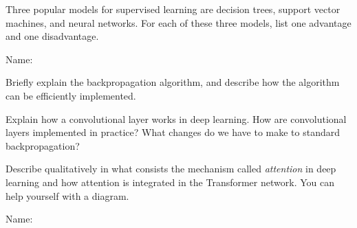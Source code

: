 \documentclass[11pt]{article}
\newcounter{marks}
\begin{document}
\begin{list}{{\bf Question :}}
\item
{}
\addtocounter{marks}{1}
Three popular models for supervised learning are decision trees, support vector machines, and neural networks. For each of these three models, list one advantage and one disadvantage.

\framebox[16cm][l]{ 
\parbox{15.9cm}{
\vspace*{6.2cm}
}}


\pagebreak

Name: \dotfill

\item
{}
\addtocounter{marks}{1}
Briefly explain the backpropagation algorithm, and describe how the algorithm can be efficiently implemented.

\framebox[16cm][l]{
\parbox{15.9cm}{
\vspace*{6.2cm}
}}

\item
{}
\addtocounter{marks}{1}
Explain how a convolutional layer works in deep learning. How are convolutional layers implemented in practice? What changes do we have to make to standard backpropagation?

\framebox[16cm][l]{ 
\parbox{15.9cm}{
\vspace*{6.2cm}
}}


\item
{}
\addtocounter{marks}{2}
Describe qualitatively in what consists the mechanism called \emph{attention} in deep learning and how attention is integrated in the Transformer network.
You can help yourself with a diagram.

\framebox[16cm][l]{ 
\parbox{15.9cm}{
\vspace*{6.2cm}
}}


\pagebreak

Name: \dotfill


\end{list}
\end{document}
